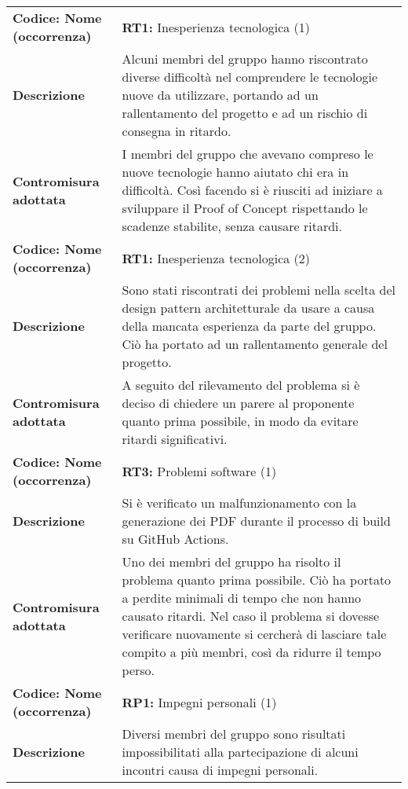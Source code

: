 \setcounter{table}{-1}
{


\centering
\renewcommand{\arraystretch}{1.5}
\begin{longtable}{C{3.5cm} | C{11cm}}
\textbf{Codice: Nome (occorrenza)} & \textbf{RT1: }{Inesperienza tecnologica (1)}\\
\textbf{Descrizione} & Alcuni membri del gruppo hanno riscontrato diverse difficoltà nel comprendere le tecnologie nuove da utilizzare, portando ad un rallentamento del progetto e ad un rischio di consegna in ritardo.\\
\textbf{Contromisura adottata} & I membri del gruppo che avevano compreso le nuove tecnologie hanno aiutato chi era in difficoltà. Così facendo si è riusciti ad iniziare a sviluppare il Proof of Concept rispettando le scadenze stabilite, senza causare ritardi.\\
\hline
{}\textbf{Codice: Nome (occorrenza)} & \textbf{RT1: }{Inesperienza tecnologica (2)}\\
\textbf{Descrizione} & Sono stati riscontrati dei problemi nella scelta del design pattern architetturale da usare a causa della mancata esperienza da parte del gruppo. Ciò ha portato ad un rallentamento generale del progetto.\\
\textbf{Contromisura adottata} & A seguito del rilevamento del problema si è deciso di chiedere un parere al proponente quanto prima possibile, in modo da evitare ritardi significativi.\\
\hline
{}\textbf{Codice: Nome (occorrenza)} & \textbf{RT3: }{Problemi software (1)}\\
\textbf{Descrizione} & Si è verificato un malfunzionamento con la generazione dei PDF durante il processo di build su GitHub Actions.\\
\textbf{Contromisura adottata} & Uno dei membri del gruppo ha risolto il problema quanto prima possibile. Ciò ha portato a perdite minimali di tempo che non hanno causato ritardi. Nel caso il problema si dovesse verificare nuovamente si cercherà di  lasciare tale compito a più membri, così da ridurre il tempo perso.\\
\hline
{}\textbf{Codice: Nome (occorrenza)} & \textbf{RP1: }{Impegni personali (1)}\\
\textbf{Descrizione} & Diversi membri del gruppo sono risultati impossibilitati alla partecipazione di alcuni incontri causa di impegni personali.\\ 

\end{longtable}}
